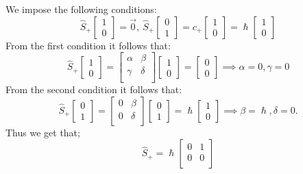 \documentclass{article}
\begin{document}
We impose the following conditions:
$$\hat{S}_+ \begin{bmatrix}
    1 \\ 0
\end{bmatrix} = \Vec{0}, \ \hat{S}_+ \begin{bmatrix}
    0 \\ 1
\end{bmatrix} = c_+ \begin{bmatrix}
    1 \\ 0
\end{bmatrix} = \hslash \begin{bmatrix}
    1 \\ 0
\end{bmatrix}  
$$
From the first condition it follows that:
$$\hat{S}_+ \begin{bmatrix}
    1 \\ 0
\end{bmatrix} = \begin{bmatrix}
    \alpha & \beta \\ \gamma & \delta \\
\end{bmatrix} \begin{bmatrix}
    1 \\ 0
\end{bmatrix}= \begin{bmatrix}
    0 \\ 0
\end{bmatrix} \implies \alpha = 0, \gamma = 0$$
From the second condition it follows that:
$$\hat{S}_+ \begin{bmatrix}
    0 \\ 1
\end{bmatrix} = \begin{bmatrix}
    0 & \beta \\ 0 & \delta \\
\end{bmatrix} \begin{bmatrix}
    0 \\ 1
\end{bmatrix}= \hslash \begin{bmatrix}
    1 \\ 0
\end{bmatrix} \implies \beta = \hslash, \delta = 0. $$
Thus we get that;
$$\hat{S}_+ = \hslash \begin{bmatrix}
    0 & 1 \\ 0 & 0 \\
\end{bmatrix}$$
\end{document}
